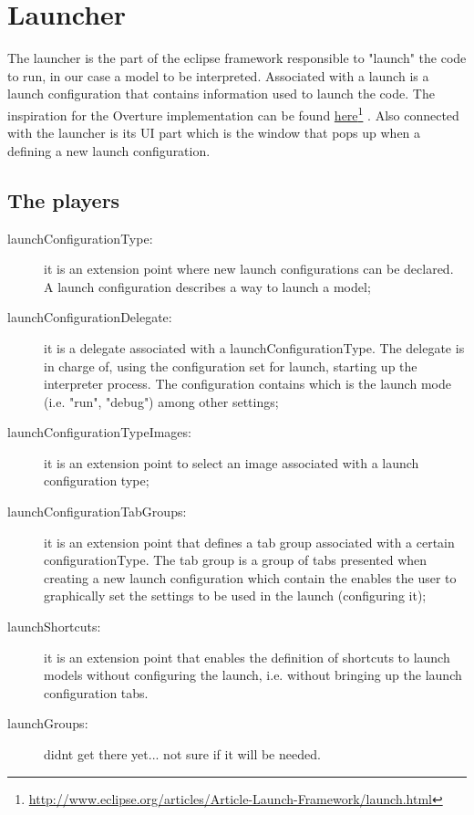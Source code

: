 \section{Launcher}
The launcher is the part of the eclipse framework responsible to "launch" the code to run, in our case a model to be interpreted. Associated with a launch is a launch configuration that contains information used to launch the code. The inspiration for the Overture implementation can be found \href{http://www.eclipse.org/articles/Article-Launch-Framework/launch.html}{here}\footnote{\url{http://www.eclipse.org/articles/Article-Launch-Framework/launch.html}} \cite{Szurszewski03}. 
Also connected with the launcher is its UI part which is the window that pops up when a defining a new launch configuration.

\subsection{The players}

\begin{description}
\item[launchConfigurationType:] it is an extension point where new launch configurations can be declared. A launch configuration describes a way to launch a model; 

\item[launchConfigurationDelegate:] it is a delegate associated with a launchConfigurationType. The delegate is in charge of, using the configuration set for launch, starting up the interpreter process. The configuration contains which is the launch mode (i.e. "run", "debug") among other settings;

\item[launchConfigurationTypeImages:] it is an extension point to select an image associated with a launch configuration type;

\item[launchConfigurationTabGroups:] it is an extension point that defines a tab group associated with a certain configurationType. The tab group is a group of tabs presented when creating a new launch configuration which contain the enables the user to graphically set the settings to be used in the launch (configuring it);

\item[launchShortcuts:] it is an extension point that enables the definition of shortcuts to launch models without configuring the launch, i.e. without bringing up the launch configuration tabs.

\item[launchGroups:] didnt get there yet... not sure if it will be needed.

\end{description}

